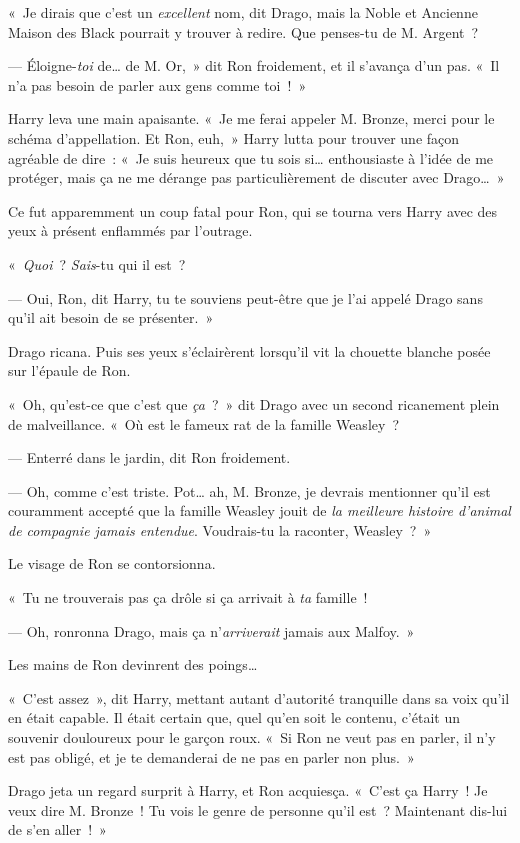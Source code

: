 «~Je dirais que c'est un \emph{excellent} nom, dit Drago, mais la Noble et Ancienne Maison des Black pourrait y trouver à redire. Que penses-tu de M. Argent~?

--- Éloigne-\emph{toi} de… de M. Or,~» dit Ron froidement, et il s'avança d'un pas. «~Il n'a pas besoin de parler aux gens comme toi~!~»

Harry leva une main apaisante. «~Je me ferai appeler M. Bronze, merci pour le schéma d'appellation. Et Ron, euh,~» Harry lutta pour trouver une façon agréable de dire~: «~Je suis heureux que tu sois si… enthousiaste à l'idée de me protéger, mais ça ne me dérange pas particulièrement de discuter avec Drago…~»

Ce fut apparemment un coup fatal pour Ron, qui se tourna vers Harry avec des yeux à présent enflammés par l'outrage.

«~\emph{Quoi}~? \emph{Sais}-tu qui il est~?

--- Oui, Ron, dit Harry, tu te souviens peut-être que je l'ai appelé Drago sans qu'il ait besoin de se présenter.~»

Drago ricana. Puis ses yeux s'éclairèrent lorsqu'il vit la chouette blanche posée sur l'épaule de Ron.

«~Oh, qu'est-ce que c'est que \emph{ça}~?~» dit Drago avec un second ricanement plein de malveillance. «~Où est le fameux rat de la famille Weasley~?

--- Enterré dans le jardin, dit Ron froidement.

--- Oh, comme c'est triste. Pot… ah, M. Bronze, je devrais mentionner qu'il est couramment accepté que la famille Weasley jouit de \emph{la meilleure histoire d'animal de compagnie jamais entendue}. Voudrais-tu la raconter, Weasley~?~»

Le visage de Ron se contorsionna.

«~Tu ne trouverais pas ça drôle si ça arrivait à \emph{ta} famille~!

--- Oh, ronronna Drago, mais ça n'\emph{arriverait} jamais aux Malfoy.~»

Les mains de Ron devinrent des poings…

«~C'est assez~», dit Harry, mettant autant d'autorité tranquille dans sa voix qu'il en était capable. Il était certain que, quel qu'en soit le contenu, c'était un souvenir douloureux pour le garçon roux. «~Si Ron ne veut pas en parler, il n'y est pas obligé, et je te demanderai de ne pas en parler non plus.~»

Drago jeta un regard surprit à Harry, et Ron acquiesça. «~C'est ça Harry~! Je veux dire M. Bronze~! Tu vois le genre de personne qu'il est~? Maintenant dis-lui de s'en aller~!~»

